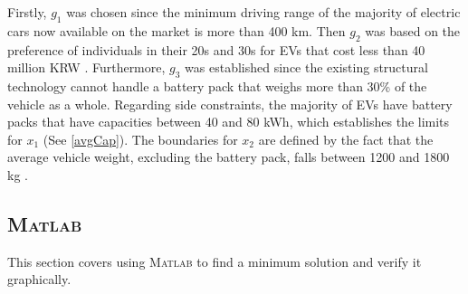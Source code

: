 \documentclass[11pt,twocolumn]{article}
\begin{document}
                Firstly, $g_1$ was chosen since the minimum driving range of the majority of electric cars now available on the market is more than 400 km.
                Then $g_2$ was based on the preference of individuals in their 20s and 30s for EVs that cost less than 40 million KRW \cite{segye24}.
                Furthermore, $g_3$ was established since the existing structural technology cannot handle a battery pack that weighs more than 30\% of the vehicle as a whole.
                Regarding side constraints, the majority of EVs have battery packs that have capacities between 40 and 80 kWh\cite{4080capacity}, which establishes the limits for $x_1$ (See \cref{avgCap}).
                The boundaries for $x_2$ are defined by the fact that the average vehicle weight, excluding the battery pack, falls between 1200 and 1800 kg \cite{glider12}.
            
    \subsection{\textsc{Matlab}}
            This section covers using \textsc{Matlab} to find a minimum solution and verify it graphically.
\end{document}
